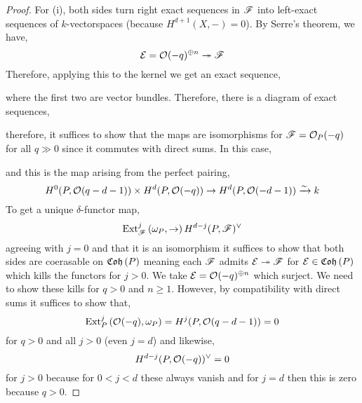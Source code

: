 \documentclass[12pt]{article}
\begin{document}
\begin{proof}
For (i), both sides turn right exact sequences in $\mathscr{F}$ into left-exact sequences of $k$-vectorspaces (because $H^{d+1}(X,-) = 0$). By Serre's theorem, we have,
\[ \mathcal{E} = \mathcal{O}_{}(-q)^{\oplus n} \twoheadrightarrow \mathscr{F} \]
Therefore, applying this to the kernel we get an exact sequence,
\begin{center}
\end{center}
where the first two are vector bundles. Therefore, there is a diagram of exact sequences,
\begin{center}
\end{center}
therefore, it suffices to show that the maps are isomorphisms for $\mathscr{F} = \mathcal{O}_{P}(-q)$ for all $q \gg 0$ since it commutes with direct sums. In this case,
\begin{center}
\end{center}
and this is the map arising from the perfect pairing,
\[ H^0(P, \mathcal{O}_{}(q - d - 1)) \times H^d(P, \mathcal{O}_{}(-q)) \to H^d(P, \mathcal{O}_{}(-d-1)) \xrightarrow{\sim} k \]
To get a unique $\delta$-functor map,
\[ \mathrm{Ext}^{j}_{\mathscr{F}} \left( \omega_P, \to \right) H^{d-j}(P, \mathscr{F})^\vee \]
agreeing with $j = 0$ and that it is an isomorphism it suffices to show that both sides are coerasable on $\mathfrak{Coh}\left(P\right)$ meaning each $\mathscr{F}$ admits $\mathcal{E} \twoheadrightarrow \mathscr{F}$ for $\mathcal{E} \in \mathfrak{Coh}\left(P\right)$ which kills the functors for $j > 0$. We take $\mathcal{E} = \mathcal{O}_{}(-q)^{\oplus n}$ which surject. We need to show these kills for $q > 0$ and $n \ge 1$. However, by compatibility with direct sums it suffices to show that,
\[ \mathrm{Ext}^{j}_{P} \left( \mathcal{O}_{}(-q), \omega_P \right) = H^j(P, \mathcal{O}_{}(q - d - 1)) = 0 \]
for $q > 0$ and all $j > 0$ (even $j = d$) and likewise,
\[ H^{d-j}(P, \mathcal{O}_{}(-q))^\vee = 0 \]
for $j > 0$ because for $0 < j < d$ these always vanish and for $j = d$ then this is zero because $q > 0$.  
\end{proof}
\end{document}
